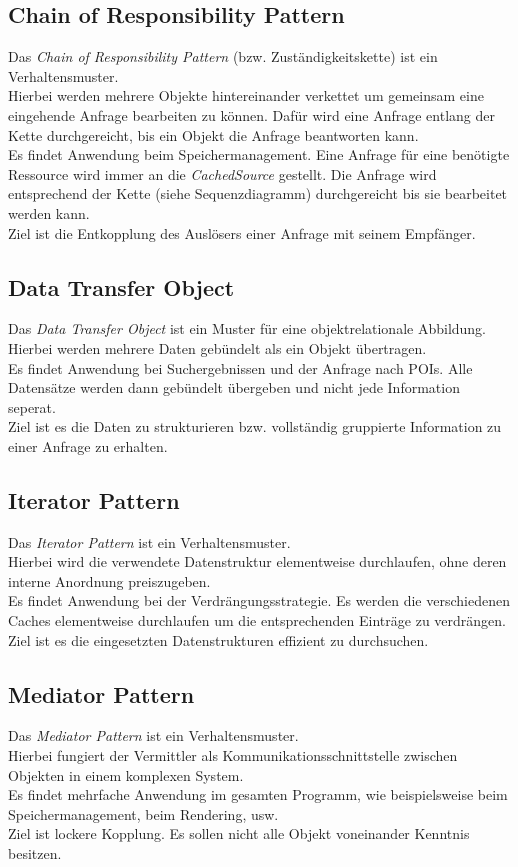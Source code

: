 \documentclass[10pt]{scrreprt}
\begin{document}
\subsection{Chain of Responsibility Pattern}
Das \textit{Chain of Responsibility Pattern} (bzw. Zuständigkeitskette) ist ein Verhaltensmuster. \\
Hierbei werden mehrere Objekte hintereinander verkettet um gemeinsam eine eingehende Anfrage bearbeiten zu können. Dafür wird eine Anfrage entlang der Kette durchgereicht, bis ein Objekt die Anfrage beantworten kann. \\ Es findet Anwendung beim Speichermanagement. Eine Anfrage für eine benötigte Ressource wird immer an die \textit{CachedSource} gestellt. Die Anfrage wird entsprechend der Kette (siehe Sequenzdiagramm) durchgereicht bis sie bearbeitet werden kann. \\ Ziel ist die Entkopplung des Auslösers einer Anfrage mit seinem Empfänger.

\subsection{Data Transfer Object}
Das \textit{Data Transfer Object} ist ein Muster für eine objektrelationale Abbildung. \\
Hierbei werden mehrere Daten gebündelt als ein Objekt übertragen. \\ Es findet Anwendung bei Suchergebnissen und der Anfrage nach POIs. Alle Datensätze werden dann gebündelt übergeben und nicht jede Information seperat. \\ Ziel ist es die Daten zu strukturieren bzw. vollständig gruppierte Information zu einer Anfrage zu erhalten.

\subsection{Iterator Pattern}
Das \textit{Iterator Pattern} ist ein Verhaltensmuster.\\ Hierbei wird die verwendete Datenstruktur elementweise durchlaufen, ohne deren interne Anordnung preiszugeben.\\ Es findet Anwendung bei der Verdrängungsstrategie. Es werden die verschiedenen Caches elementweise durchlaufen um die entsprechenden Einträge zu verdrängen.\\
Ziel ist es die eingesetzten Datenstrukturen effizient zu durchsuchen.

\newpage
\subsection{Mediator Pattern}
Das \textit{Mediator Pattern} ist ein Verhaltensmuster. \\ Hierbei fungiert der Vermittler als Kommunikationsschnittstelle zwischen Objekten in einem komplexen System.\\ Es findet mehrfache Anwendung im gesamten Programm, wie beispielsweise beim Speichermanagement, beim Rendering, usw. \\ Ziel ist lockere Kopplung. Es sollen nicht alle Objekt voneinander Kenntnis besitzen.
\end{document}
